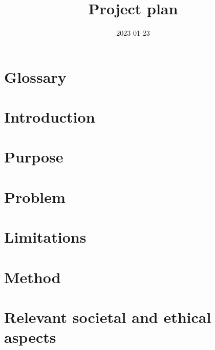 \documentclass[titlepage]{article}
\title{%
    \Huge Project plan
}
\date{2023-01-23}
\begin{document}
\maketitle
\newpage

\tableofcontents
\thispagestyle{plain}
\newpage

\section*{Glossary}
    
\thispagestyle{plain}
\newpage

\section{Introduction}
    

\section{Purpose} \label{Purpose}
    

\section{Problem}
    

\section{Limitations}
    

\section{Method}
    

\section{Relevant societal and ethical aspects}
    




\appendix
\end{document}
